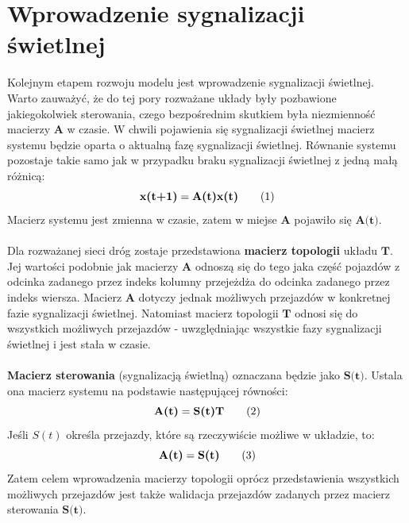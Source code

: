 \documentclass[12pt]{book}
\theoremstyle{plain}
\newcommand\addtag{\refstepcounter{equation}
\renewcommand{\labelenumii}{\theenumii}
\renewcommand{\theenumii}{\theenumi.\arabic{enumii}.}
\tag{\theequation}}
\begin{document}
\section{Wprowadzenie sygnalizacji świetlnej}
Kolejnym etapem rozwoju modelu jest wprowadzenie sygnalizacji świetlnej. Warto zauważyć, że do tej pory rozważane układy były pozbawione jakiegokolwiek sterowania, czego bezpośrednim skutkiem była niezmienność macierzy $\textbf{A}$ w czasie. W chwili pojawienia się sygnalizacji świetlnej macierz systemu będzie oparta o aktualną fazę sygnalizacji świetlnej. Równanie systemu pozostaje takie samo jak w przypadku braku sygnalizacji świetlnej z jedną małą różnicą:
\[\textbf{x(t+1)}=\textbf{A(t)x(t)} \addtag \]
Macierz systemu jest zmienna w czasie, zatem w miejse $\textbf{A}$ pojawiło się $\textbf{A(t)}$. \\ \\
Dla rozważanej sieci dróg zostaje przedstawiona \textbf{macierz topologii} układu $\textbf{T}$. Jej wartości podobnie jak macierzy $\textbf{A}$ odnoszą się do tego jaka część pojazdów z odcinka zadanego przez indeks kolumny przejeżdża do odcinka zadanego przez indeks wiersza. Macierz $\textbf{A}$ dotyczy jednak możliwych przejazdów w konkretnej fazie sygnalizacji świetlnej. Natomiast macierz topologii $\textbf{T}$ odnosi się do wszystkich możliwych przejazdów -  uwzględniając wszystkie fazy sygnalizacji świetlnej i jest stała w czasie. \\ \\
\noindent
\textbf{Macierz sterowania} (sygnalizacją świetlną) oznaczana będzie jako $\textbf{S(t)}$. Ustala ona macierz systemu na podstawie następującej równości:
\[\textbf{A(t)}=\textbf{S(t)T} \addtag \]
Jeśli $S(t)$ określa przejazdy, które są rzeczywiście możliwe w układzie, to:
\[\textbf{A(t)}=\textbf{S(t)} \addtag \]
Zatem celem wprowadzenia macierzy topologii oprócz przedstawienia wszystkich możliwych przejazdów jest także walidacja przejazdów zadanych przez macierz sterowania $\textbf{S(t)}$.
\end{document}
